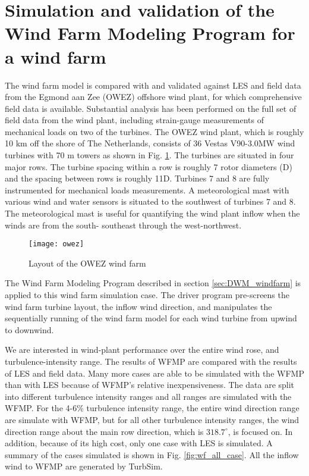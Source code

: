 \documentclass{umthesis}
\begin{document}
\section{Simulation and validation of the Wind Farm Modeling Program for a wind farm}\label{sec:wind_farm_results}
The wind farm model is compared with and validated against LES and field data from the Egmond aan Zee (OWEZ) offshore wind plant, for which comprehensive field data is available. Substantial analysis has been performed on the full set of field data from the wind plant, including strain-gauge measurements of mechanical loads on two of the turbines. The OWEZ wind plant, which is roughly 10 km off the shore of The Netherlands, consists of 36 Vestas
V90-3.0MW wind turbines with 70 m towers as shown in Fig. \ref{fig:owez}. The turbines are situated in four
major rows. The turbine spacing within a row is roughly 7 rotor diameters (D) and the spacing between rows is roughly 11D. Turbines 7 and 8 are fully instrumented for mechanical loads measurements. A meteorological mast with various wind and water sensors is situated to the southwest of turbines 7 and 8. The meteorological mast is useful for quantifying the wind plant inflow when the winds are from the south- southeast through the west-northwest.
\begin{figure}
  \centering
  \texttt{[image: owez]}
  \caption{Layout of the OWEZ wind farm}\label{fig:owez}
\end{figure}

The Wind Farm Modeling Program described in section \ref{sec:DWM_windfarm} is applied to this wind farm simulation case. The driver program pre-screens the wind farm turbine layout, the inflow wind direction, and manipulates the sequentially running of the wind farm model for each wind turbine from upwind to downwind. 

We are interested in wind-plant performance over the entire wind rose, and turbulence-intensity range. The results of WFMP are compared with the results of LES and field data. Many more cases are able to be simulated with the WFMP than with LES because of WFMP’s relative inexpensiveness. The data are split into different turbulence intensity ranges and all ranges are simulated with the WFMP. For the 4-6\% turbulence intensity range, the entire wind direction range are simulate with WFMP, but for all other turbulence intensity ranges, the wind direction range about the main row direction, which is $318.7^\circ$, is focused on. In addition, because of its high cost, only one case with LES is simulated. A summary of the cases simulated is shown in Fig. \ref{fig:wf_all_case}. All the inflow wind to WFMP are generated by TurbSim.
\end{document}
